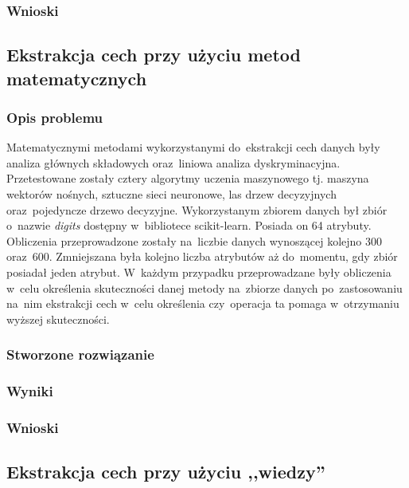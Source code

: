 \subsubsection{Wnioski}

\subsection{Ekstrakcja cech przy użyciu metod matematycznych}

\subsubsection{Opis problemu}
Matematycznymi metodami wykorzystanymi do~ekstrakcji cech danych były analiza głównych składowych oraz~liniowa analiza dyskryminacyjna. Przetestowane zostały cztery algorytmy uczenia maszynowego tj. maszyna wektorów nośnych, sztuczne sieci neuronowe, las drzew decyzyjnych oraz~pojedyncze drzewo decyzyjne. Wykorzystanym zbiorem danych był zbiór o~nazwie \textit{digits} dostępny w~bibliotece scikit-learn. Posiada on 64 atrybuty. Obliczenia przeprowadzone zostały na~liczbie danych wynoszącej kolejno 300 oraz~600. Zmniejszana była kolejno liczba atrybutów aż do~momentu, gdy zbiór posiadał jeden atrybut. W~każdym przypadku przeprowadzane były obliczenia w~celu określenia skuteczności danej metody na~zbiorze danych po~zastosowaniu na~nim ekstrakcji cech w~celu określenia czy~operacja ta pomaga w~otrzymaniu wyższej skuteczności.

\subsubsection{Stworzone rozwiązanie}
\subsubsection{Wyniki}
\subsubsection{Wnioski}

\subsection{Ekstrakcja cech przy użyciu ,,wiedzy''}
